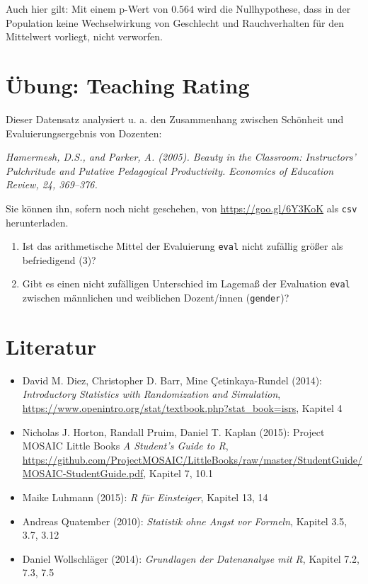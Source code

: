 \documentclass[12pt,ngerman,paper=a4,pagesize,DIV=13]{scrreprt}
\providecommand{\tightlist}{%
  \setlength{\itemsep}{0pt}\setlength{\parskip}{0pt}}
\begin{document}
Auch hier gilt: Mit einem p-Wert von \(0.564\) wird die Nullhypothese,
dass in der Population keine Wechselwirkung von Geschlecht und
Rauchverhalten für den Mittelwert vorliegt, nicht verworfen.

\hypertarget{ubung-teaching-rating-2}{%
\section{Übung: Teaching Rating}\label{ubung-teaching-rating-2}}

Dieser Datensatz analysiert u. a. den Zusammenhang zwischen Schönheit
und Evaluierungsergebnis von Dozenten:

\emph{Hamermesh, D.S., and Parker, A. (2005). Beauty in the Classroom:
Instructors' Pulchritude and Putative Pedagogical Productivity.
Economics of Education Review, 24, 369--376.}

Sie können ihn, sofern noch nicht geschehen, von
\url{https://goo.gl/6Y3KoK} als \texttt{csv} herunterladen.

\begin{enumerate}
\def\labelenumi{\arabic{enumi}.}
\tightlist
\item
  Ist das arithmetische Mittel der Evaluierung \texttt{eval} nicht
  zufällig größer als befriedigend (3)?
\item
  Gibt es einen nicht zufälligen Unterschied im Lagemaß der Evaluation
  \texttt{eval} zwischen männlichen und weiblichen Dozent/innen
  (\texttt{gender})?
\end{enumerate}

\hypertarget{literatur-4}{%
\section{Literatur}\label{literatur-4}}

\begin{itemize}
\tightlist
\item
  David M. Diez, Christopher D. Barr, Mine Çetinkaya-Rundel (2014):
  \emph{Introductory Statistics with Randomization and Simulation},
  \url{https://www.openintro.org/stat/textbook.php?stat_book=isrs},
  Kapitel 4
\item
  Nicholas J. Horton, Randall Pruim, Daniel T. Kaplan (2015): Project
  MOSAIC Little Books \emph{A Student's Guide to R},
  \url{https://github.com/ProjectMOSAIC/LittleBooks/raw/master/StudentGuide/MOSAIC-StudentGuide.pdf},
  Kapitel 7, 10.1
\item
  Maike Luhmann (2015): \emph{R für Einsteiger}, Kapitel 13, 14
\item
  Andreas Quatember (2010): \emph{Statistik ohne Angst vor Formeln},
  Kapitel 3.5, 3.7, 3.12
\item
  Daniel Wollschläger (2014): \emph{Grundlagen der Datenanalyse mit R},
  Kapitel 7.2, 7.3, 7.5
\end{itemize}
\end{document}

